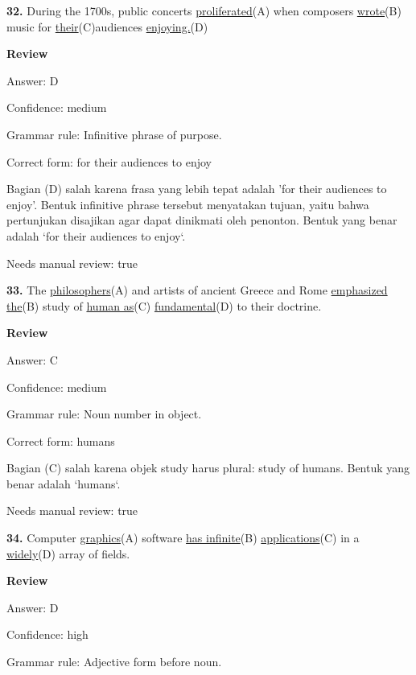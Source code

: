 \documentclass[12pt]{article}
\begin{document}
\noindent\textbf{32.} During the 1700s, public concerts \uline{proliferated}(A) when composers \uline{wrote}(B) music for \uline{their}(C)audiences \uline{enjoying.}(D)
\par
\begingroup
\setlength{\parskip}{0pt}
\setlength{\parindent}{0pt}
\textbf{Review}\par
Answer: D\par
Confidence: medium\par
Grammar rule: Infinitive phrase of purpose.\par
Correct form: for their audiences to enjoy\par
Bagian (D) salah karena frasa yang lebih tepat adalah 'for their audiences to enjoy'. Bentuk infinitive phrase tersebut menyatakan tujuan, yaitu bahwa pertunjukan disajikan agar dapat dinikmati oleh penonton. Bentuk yang benar adalah `for their audiences to enjoy`.\par
Needs manual review: true\par
\endgroup
\par
\vspace{\questionblockgap}
\noindent\textbf{33.} The \uline{philosophers}(A) and artists of ancient Greece and Rome \uline{emphasized the}(B) study of \uline{human as}(C) \uline{fundamental}(D) to their doctrine.
\par
\begingroup
\setlength{\parskip}{0pt}
\setlength{\parindent}{0pt}
\textbf{Review}\par
Answer: C\par
Confidence: medium\par
Grammar rule: Noun number in object.\par
Correct form: humans\par
Bagian (C) salah karena objek study harus plural: study of humans. Bentuk yang benar adalah `humans`.\par
Needs manual review: true\par
\endgroup
\par
\vspace{\questionblockgap}
\noindent\textbf{34.} Computer \uline{graphics}(A) software \uline{has infinite}(B) \uline{applications}(C) in a \uline{widely}(D) array of fields.
\par
\begingroup
\setlength{\parskip}{0pt}
\setlength{\parindent}{0pt}
\textbf{Review}\par
Answer: D\par
Confidence: high\par
Grammar rule: Adjective form before noun.\par
\end{document}

